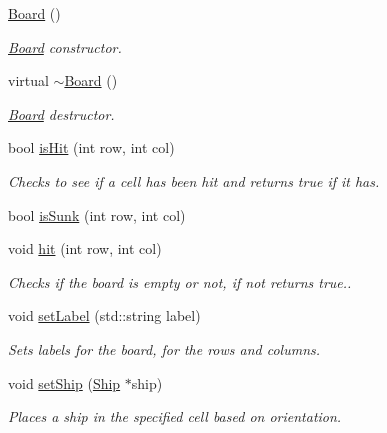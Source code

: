 \begin{DoxyCompactItemize}
\item 
\mbox{\label{classBoard_a9ee491d4fea680cf69b033374a9fdfcb}} 
\mbox{\hyperlink{classBoard_a9ee491d4fea680cf69b033374a9fdfcb}{Board}} ()
\begin{DoxyCompactList}\small\item\em \mbox{\hyperlink{classBoard}{Board}} constructor. \end{DoxyCompactList}\item 
\mbox{\label{classBoard_a2fba9e5428840eb48645c078b9f0dcce}} 
virtual \mbox{\hyperlink{classBoard_a2fba9e5428840eb48645c078b9f0dcce}{$\sim$\+Board}} ()
\begin{DoxyCompactList}\small\item\em \mbox{\hyperlink{classBoard}{Board}} destructor. \end{DoxyCompactList}\item 
bool \mbox{\hyperlink{classBoard_a6ac4c446c46824635b189b850f8cfa0a}{is\+Hit}} (int row, int col)
\begin{DoxyCompactList}\small\item\em Checks to see if a cell has been hit and returns true if it has. \end{DoxyCompactList}\item 
bool \mbox{\hyperlink{classBoard_a56efd14031412179435e32a4a6f64f8f}{is\+Sunk}} (int row, int col)
\item 
void \mbox{\hyperlink{classBoard_abbbcf159450dc2114a00936452b15cad}{hit}} (int row, int col)
\begin{DoxyCompactList}\small\item\em Checks if the board is empty or not, if not returns true.. \end{DoxyCompactList}\item 
void \mbox{\hyperlink{classBoard_a7a97997bb60144af98dd6e1d9bef65ba}{set\+Label}} (std\+::string label)
\begin{DoxyCompactList}\small\item\em Sets labels for the board, for the rows and columns. \end{DoxyCompactList}\item 
void \mbox{\hyperlink{classBoard_a753f4f1beb3fe211c2f97ade27049f6d}{set\+Ship}} (\mbox{\hyperlink{classShip}{Ship}} $\ast$ship)
\begin{DoxyCompactList}\small\item\em Places a ship in the specified cell based on orientation. \end{DoxyCompactList}\item 

\end{DoxyCompactItemize}
